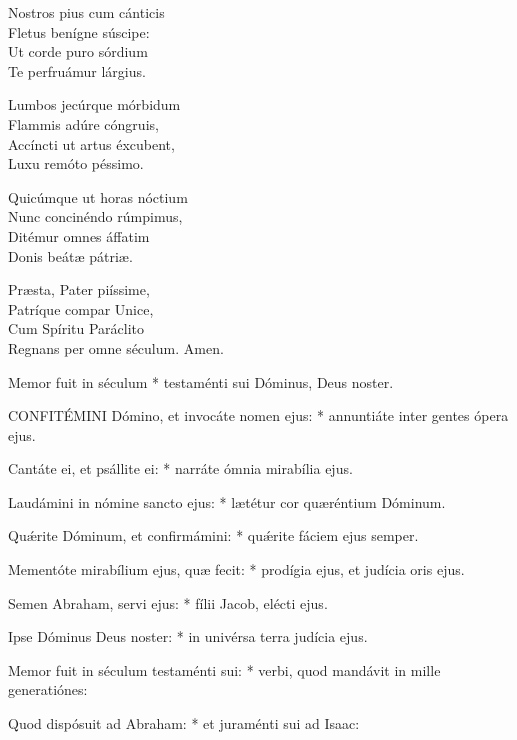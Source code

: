 Nostros pius cum cánticis\\
Fletus benígne súscipe:\\
Ut corde puro sórdium\\
Te perfruámur lárgius.

Lumbos jecúrque mórbidum\\
Flammis adúre cóngruis,\\
Accíncti ut artus éxcubent,\\
Luxu remóto péssimo.

Quicúmque ut horas nóctium\\
Nunc concinéndo rúmpimus,\\
Ditémur omnes áffatim\\
Donis beátæ pátriæ.

Præsta, Pater piíssime,\\
Patríque compar Unice,\\
Cum Spíritu Paráclito\\
Regnans per omne séculum. Amen.



 Memor fuit in séculum * testaménti sui Dóminus, Deus noster.


\lettrine[lines=2]{C}{ONFITÉMINI} Dómino, et invocáte nomen ejus: * annuntiáte inter gentes ópera ejus.

Cantáte ei, et psállite ei: * narráte ómnia mirabília ejus.

Laudámini in nómine sancto ejus: * lætétur cor quæréntium Dóminum.

Quǽrite Dóminum, et confirmámini: * quǽrite fáciem ejus semper.

Mementóte mirabílium ejus, quæ fecit: * prodígia ejus, et judícia oris ejus.

Semen Abraham, servi ejus: * fílii Jacob, elécti ejus.

Ipse Dóminus Deus noster: * in univérsa terra judícia ejus.

Memor fuit in séculum testaménti sui: * verbi, quod mandávit in mille generatiónes:

Quod dispósuit ad Abraham: * et juraménti sui ad Isaac:

